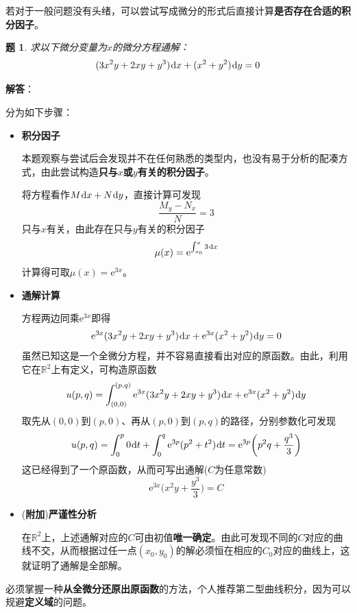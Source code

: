 \documentclass[a4paper,UTF8,fontset=windows,AutoFakeBold]{ctexart}
\newcommand*{\dr}{\hspace{0.07em}\mathrm{d}}
\newcommand*{\er}{\mathrm{e}}
\newcommand*{\rb}{\mathbb{R}}
\newcommand*{\extra}{\textbf{附加}}
\newcommand*{\note}{\noindent *}
\theoremstyle{ex}
\newtheorem{exercise}{题}
\newcommand{\sol}[1]{{\vspace{5pt}\kaishu\noindent\textbf{解答}：\vspace{-3pt}
\begin{compactitem}
    \item[] #1
\end{compactitem}
}}
\begin{document}
\note 若对于一般问题没有头绪，可以尝试写成微分的形式后直接计算\textbf{是否存在合适的积分因子}。

\begin{framed}
\begin{exercise}
    求以下微分变量为$x$的微分方程通解：
    $$(3x^2y+2xy+y^3)\dr x+(x^2+y^2)\dr y=0$$
\end{exercise}
\sol{
    分为如下步骤：
    \begin{itemize}
        \item \textbf{积分因子}
        
        本题观察与尝试后会发现并不在任何熟悉的类型内，也没有易于分析的配凑方式，由此尝试构造\textbf{只与$x$或$y$有关的积分因子}。

        将方程看作$M\dr x+N\dr y$，直接计算可发现
        $$\frac{M_y-N_x}{N}=3$$
        只与$x$有关，由此存在只与$y$有关的积分因子
        $$\mu(x)=\er^{\int_{x_0}^x3\dr x}$$
        计算得可取$\mu(x)=\er^{3x}$。

        \item \textbf{通解计算}
        
        方程两边同乘$\er^{3x}$即得
        $$\er^{3x}(3x^2y+2xy+y^3)\dr x+\er^{3x}(x^2+y^2)\dr y=0$$
        虽然已知这是一个全微分方程，并不容易直接看出对应的原函数。由此，利用它在$\rb^2$上有定义，可构造原函数
        $$u(p,q)=\int_{(0,0)}^{(p,q)}\er^{3x}(3x^2y+2xy+y^3)\dr x+\er^{3x}(x^2+y^2)\dr y$$
        取先从$(0,0)$到$(p,0)$、再从$(p,0)$到$(p,q)$的路径，分别参数化可发现
        $$u(p,q)=\int_0^p0\dr t+\int_0^q\er^{3p}(p^2+t^2)\dr t=\er^{3p}\bigg(p^2q+\frac{q^3}{3}\bigg)$$
        这已经得到了一个原函数，从而可写出通解($C$为任意常数)
        $$\er^{3x}\bigg(x^2y+\frac{y^3}{3}\bigg)=C$$

        \item (\extra)\textbf{严谨性分析}
        
        在$\rb^2$上，上述通解对应的$C$可由初值\textbf{唯一确定}。由此可发现不同的$C$对应的曲线不交，从而根据过任一点$(x_0,y_0)$的解必须恒在相应的$C_0$对应的曲线上，这就证明了通解是全部解。
    \end{itemize}    
}
\end{framed}

\note 必须掌握一种\textbf{从全微分还原出原函数}的方法，个人推荐第二型曲线积分，因为可以规避\textbf{定义域}的问题。
\end{document}
